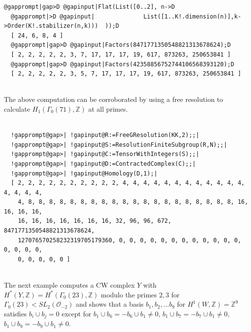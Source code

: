 \documentclass[a4paper,11pt]{report}
\begin{document}
{{\begin{Verbatim}[commandchars=@|D,fontsize=\small,frame=single,label=Example]
  @gapprompt|gap>D @gapinput|Flat(List([0..2], n->D
  @gapprompt|>D @gapinput|              List([1..K!.dimension(n)],k->Order(K!.stabilizer(n,k)))  ));D
  [ 24, 6, 8, 4 ]
  @gapprompt|gap>D @gapinput|Factors(8471771350548821313678624);D
  [ 2, 2, 2, 2, 2, 3, 7, 17, 17, 17, 19, 617, 873263, 250653841 ]
  @gapprompt|gap>D @gapinput|Factors(42358856752744106568393120);D
  [ 2, 2, 2, 2, 2, 3, 5, 7, 17, 17, 17, 19, 617, 873263, 250653841 ]
  
\end{Verbatim}
 The above computation can be corroborated by using a free resolution to
calculate $H_1(\Gamma_0(71),\mathbb Z)$ at all primes. 
\begin{Verbatim}[commandchars=!@|,fontsize=\small,frame=single,label=Example]
  		
  !gapprompt@gap>| !gapinput@R:=FreeGResolution(KK,2);;|
  !gapprompt@gap>| !gapinput@S:=ResolutionFiniteSubgroup(R,N);;|
  !gapprompt@gap>| !gapinput@C:=TensorWithIntegers(S);;|
  !gapprompt@gap>| !gapinput@D:=ContractedComplex(C);;|
  !gapprompt@gap>| !gapinput@Homology(D,1);|
  [ 2, 2, 2, 2, 2, 2, 2, 2, 2, 2, 4, 4, 4, 4, 4, 4, 4, 4, 4, 4, 4, 4, 4, 4, 4, 4, 
    4, 8, 8, 8, 8, 8, 8, 8, 8, 8, 8, 8, 8, 8, 8, 8, 8, 8, 8, 8, 8, 16, 16, 16, 16,
    16, 16, 16, 16, 16, 16, 16, 32, 96, 96, 672, 8471771350548821313678624, 
    127076570258232319705179360, 0, 0, 0, 0, 0, 0, 0, 0, 0, 0, 0, 0, 0, 0, 0, 0, 
    0, 0, 0, 0, 0 ]
  
\end{Verbatim}
 The next example computes a CW complex $Y$ with $H^\ast(Y,\mathbb Z) =H^\ast(\Gamma_0(23),\mathbb Z)$ modulo the primes $2,3$ for $\Gamma_0(23) < SL_2({\mathcal O}_{-2})$ and shows that a basis $b_1,b_2,\ldots b_9$ for $H^1(W,\mathbb Z) =\mathbb Z^{9}$ satisfies $b_i\cup b_j=0$ except for $b_1\cup b_6 = -b_6\cup b_1\neq 0$, $b_1\cup b_7 =-b_7\cup b_1\ne 0$, $b_1\cup b_9=-b_9\cup b_1\ne 0$. 
\begin{Verbatim}[commandchars=!@|,fontsize=\small,frame=single,label=Example]
                  

\end{Verbatim}}}
\end{document}
